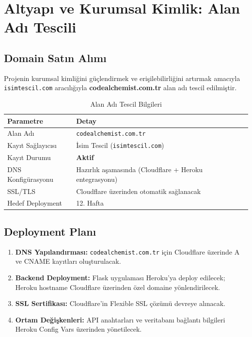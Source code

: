 \documentclass[12pt,a4paper]{article}
\begin{document}
\section{Altyapı ve Kurumsal Kimlik: Alan Adı Tescili}

\subsection{Domain Satın Alımı}

Projenin kurumsal kimliğini güçlendirmek ve erişilebilirliğini artırmak amacıyla \texttt{isimtescil.com} aracılığıyla \textbf{codealchemist.com.tr} alan adı tescil edilmiştir.

\begin{table}[H]
\centering
\caption{Alan Adı Tescil Bilgileri}
\begin{tabularx}{\textwidth}{@{} l X @{}}
\toprule
\textbf{Parametre} & \textbf{Detay} \\
\midrule
Alan Adı          & \texttt{codealchemist.com.tr} \\
Kayıt Sağlayıcısı & İsim Tescil (\texttt{isimtescil.com}) \\
Kayıt Durumu      & \textcolor{codegreen}{\textbf{Aktif}} \\
DNS Konfigürasyonu & Hazırlık aşamasında (Cloudflare + Heroku entegrasyonu) \\
SSL/TLS           & Cloudflare üzerinden otomatik sağlanacak \\
Hedef Deployment  & 12. Hafta \\
\bottomrule
\end{tabularx}
\end{table}

\subsection{Deployment Planı}

\begin{enumerate}[leftmargin=2em, itemsep=4pt]
    \item \textbf{DNS Yapılandırması:} \texttt{codealchemist.com.tr} için Cloudflare üzerinde A ve CNAME kayıtları oluşturulacak.
    \item \textbf{Backend Deployment:} Flask uygulaması Heroku'ya deploy edilecek; Heroku hostname Cloudflare üzerinden özel domaine yönlendirilecek.
    \item \textbf{SSL Sertifikası:} Cloudflare'in Flexible SSL çözümü devreye alınacak.
    \item \textbf{Ortam Değişkenleri:} API anahtarları ve veritabanı bağlantı bilgileri Heroku Config Vars üzerinden yönetilecek.
\end{enumerate}
\end{document}
